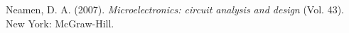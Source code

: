 \documentclass[conference]{IEEEtran}
\begin{document}
%    
%   
%
%
\begin{thebibliography}{00}
 Neamen, D. A. (2007). \textit{Microelectronics: circuit analysis and design} (Vol. 43). New York: McGraw-Hill.
\end{thebibliography}
\end{document}
